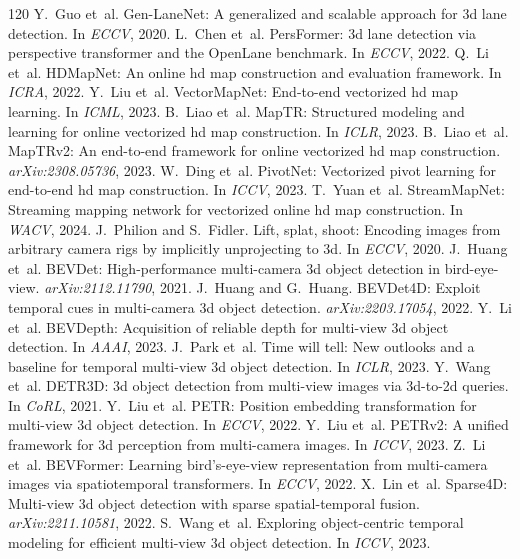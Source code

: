 \documentclass[10pt,twocolumn]{article}
\begin{document}
\begin{thebibliography}{120}
 Y.~Guo et~al. Gen-LaneNet: A generalized and scalable approach for 3d lane detection. In \emph{ECCV}, 2020.
 L.~Chen et~al. PersFormer: 3d lane detection via perspective transformer and the OpenLane benchmark. In \emph{ECCV}, 2022.
 Q.~Li et~al. HDMapNet: An online hd map construction and evaluation framework. In \emph{ICRA}, 2022.
 Y.~Liu et~al. VectorMapNet: End-to-end vectorized hd map learning. In \emph{ICML}, 2023.
 B.~Liao et~al. MapTR: Structured modeling and learning for online vectorized hd map construction. In \emph{ICLR}, 2023.
 B.~Liao et~al. MapTRv2: An end-to-end framework for online vectorized hd map construction. \emph{arXiv:2308.05736}, 2023.
 W.~Ding et~al. PivotNet: Vectorized pivot learning for end-to-end hd map construction. In \emph{ICCV}, 2023.
 T.~Yuan et~al. StreamMapNet: Streaming mapping network for vectorized online hd map construction. In \emph{WACV}, 2024.
 J.~Philion and S.~Fidler. Lift, splat, shoot: Encoding images from arbitrary camera rigs by implicitly unprojecting to 3d. In \emph{ECCV}, 2020.
 J.~Huang et~al. BEVDet: High-performance multi-camera 3d object detection in bird-eye-view. \emph{arXiv:2112.11790}, 2021.
 J.~Huang and G.~Huang. BEVDet4D: Exploit temporal cues in multi-camera 3d object detection. \emph{arXiv:2203.17054}, 2022.
 Y.~Li et~al. BEVDepth: Acquisition of reliable depth for multi-view 3d object detection. In \emph{AAAI}, 2023.
 J.~Park et~al. Time will tell: New outlooks and a baseline for temporal multi-view 3d object detection. In \emph{ICLR}, 2023.
 Y.~Wang et~al. DETR3D: 3d object detection from multi-view images via 3d-to-2d queries. In \emph{CoRL}, 2021.
 Y.~Liu et~al. PETR: Position embedding transformation for multi-view 3d object detection. In \emph{ECCV}, 2022.
 Y.~Liu et~al. PETRv2: A unified framework for 3d perception from multi-camera images. In \emph{ICCV}, 2023.
 Z.~Li et~al. BEVFormer: Learning bird's-eye-view representation from multi-camera images via spatiotemporal transformers. In \emph{ECCV}, 2022.
 X.~Lin et~al. Sparse4D: Multi-view 3d object detection with sparse spatial-temporal fusion. \emph{arXiv:2211.10581}, 2022.
 S.~Wang et~al. Exploring object-centric temporal modeling for efficient multi-view 3d object detection. In \emph{ICCV}, 2023.

\end{thebibliography}
\end{document}
